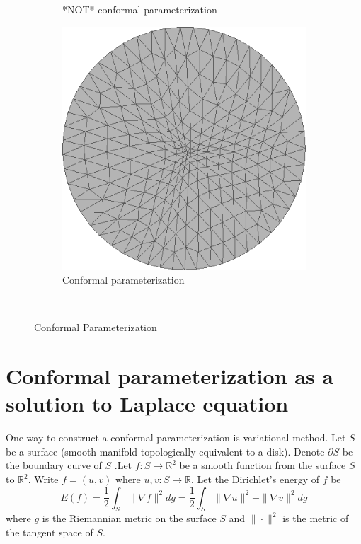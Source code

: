 \documentclass{article} %
\begin{document}
\begin{figure}[h!]
\begin{subfigure}[b]{0.4\textwidth}
                \caption{*NOT* conformal parameterization}
                \label{fig:pargraph}
        \end{subfigure}
        \begin{subfigure}[b]{0.4\textwidth}
                \includegraphics[width=\textwidth]{f1b.png}
                \caption{Conformal parameterization}
                \label{fig:parconf}
        \end{subfigure}
        ~ %
        \caption{Conformal Parameterization}\label{fig:footpar}
\end{figure}


\section{Conformal parameterization as a solution to Laplace equation}

One way to construct a conformal parameterization is variational method. Let $S$ be a surface (smooth manifold topologically equivalent to a disk). Denote $\partial S$ be the boundary curve of $S$ .Let $f: S \rightarrow \mathbb{R}^2$ be a smooth function from the surface $S$ to $\mathbb{R}^2$. Write $f = (u, v)$ where $u,v: S \rightarrow \mathbb{R}$. Let the Dirichlet's energy of $f$ be
$$
	E(f) = \frac{1}{2} \int_S \| \nabla f \|^2 dg =  \frac{1}{2} \int_S \| \nabla u \|^2 + \| \nabla v \|^2 dg 
$$
where $g$ is the Riemannian metric on the surface $S$ and $\| \cdot \|^2$ is the metric of the tangent space of $S$. 
\end{document}
